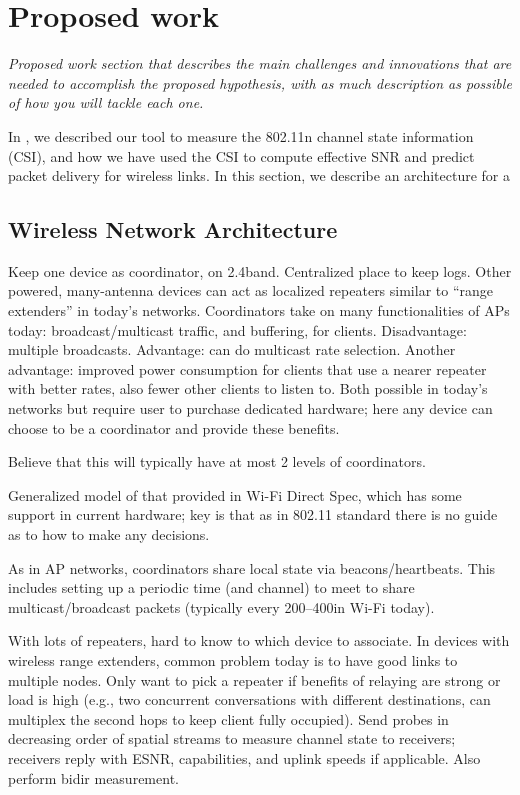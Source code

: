 \section{Proposed work}
\label{sec:proposed}
\emph{\color{red}Proposed work section that describes the main challenges and
innovations that are needed to accomplish the proposed hypothesis, with
as much description as possible of how you will tackle each one.}

In , we described our tool to measure the 802.11n channel state information (CSI), and how we have used the CSI to compute effective SNR and predict packet delivery for wireless links. In this section, we describe an architecture for a 

\subsection{Wireless Network Architecture}
Keep one device as coordinator, on 2.4\GHz band. Centralized place to keep logs. Other powered, many-antenna devices can act as localized repeaters similar to ``range extenders'' in today's networks. Coordinators take on many functionalities of APs today: broadcast/multicast traffic, and buffering, for clients. Disadvantage: multiple broadcasts. Advantage: can do multicast rate selection. Another advantage: improved power consumption for clients that use a nearer repeater with better rates, also fewer other clients to listen to. Both possible in today's networks but require user to purchase dedicated hardware; here any device can choose to be a coordinator and provide these benefits.

Believe that this will typically have at most 2 levels of coordinators.

Generalized model of that provided in Wi-Fi Direct Spec, which has some support in current hardware; key is that as in 802.11 standard there is no guide as to how to make any decisions.

As in AP networks, coordinators share local state via beacons/heartbeats. This includes setting up a periodic time (and channel) to meet to share multicast/broadcast packets (typically every 200--400\ms in Wi-Fi today).

With lots of repeaters, hard to know to which device to associate. In devices with wireless range extenders, common problem today is to have good links to multiple nodes. Only want to pick a repeater if benefits of relaying are strong or load is high (e.g., two concurrent conversations with different destinations, can multiplex the second hops to keep client fully occupied). Send probes in decreasing order of spatial streams to measure channel state to receivers; receivers reply with ESNR, capabilities, and uplink speeds if applicable. Also perform bidir measurement.

